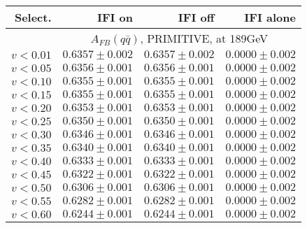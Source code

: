 \documentclass[12pt]{article}
\begin{document}
 
\begin{table}[!ht]
\centering
\caption{\footnotesize\sf
}
\begin{tabular}                                                                                          {||r|r|r|r||}
\hline\hline
Select.                         &
IFI on                          &
IFI off                         &
IFI alone                       
\\
\hline
& \multicolumn{ 3}{c||}{
     $A_{FB}(q\bar{q})$, PRIMITIVE, at 189GeV                                         }
\\
\hline
 $ v<0.01$                       & $    0.6357\pm   0.002$ & $    0.6357\pm   0.002$ & $    0.0000\pm   0.002$
\\
 $ v<0.05$                       & $    0.6356\pm   0.001$ & $    0.6356\pm   0.001$ & $    0.0000\pm   0.002$
\\
 $ v<0.10$                       & $    0.6355\pm   0.001$ & $    0.6355\pm   0.001$ & $    0.0000\pm   0.002$
\\
 $ v<0.15$                       & $    0.6355\pm   0.001$ & $    0.6355\pm   0.001$ & $    0.0000\pm   0.002$
\\
 $ v<0.20$                       & $    0.6353\pm   0.001$ & $    0.6353\pm   0.001$ & $    0.0000\pm   0.002$
\\
 $ v<0.25$                       & $    0.6350\pm   0.001$ & $    0.6350\pm   0.001$ & $    0.0000\pm   0.002$
\\
 $ v<0.30$                       & $    0.6346\pm   0.001$ & $    0.6346\pm   0.001$ & $    0.0000\pm   0.002$
\\
 $ v<0.35$                       & $    0.6340\pm   0.001$ & $    0.6340\pm   0.001$ & $    0.0000\pm   0.002$
\\
 $ v<0.40$                       & $    0.6333\pm   0.001$ & $    0.6333\pm   0.001$ & $    0.0000\pm   0.002$
\\
 $ v<0.45$                       & $    0.6322\pm   0.001$ & $    0.6322\pm   0.001$ & $    0.0000\pm   0.002$
\\
 $ v<0.50$                       & $    0.6306\pm   0.001$ & $    0.6306\pm   0.001$ & $    0.0000\pm   0.002$
\\
 $ v<0.55$                       & $    0.6282\pm   0.001$ & $    0.6282\pm   0.001$ & $    0.0000\pm   0.002$
\\
 $ v<0.60$                       & $    0.6244\pm   0.001$ & $    0.6244\pm   0.001$ & $    0.0000\pm   0.002$

\end{tabular}
\end{table}
\end{document}
